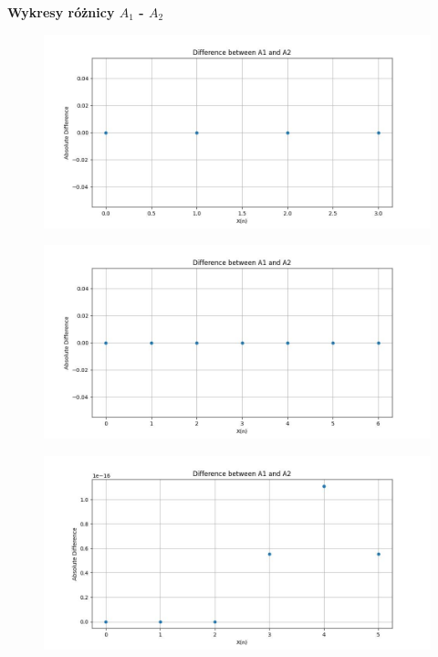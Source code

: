 \documentclass{article}
\begin{document}
\hspace{}

\textbf{Wykresy różnicy $A_1$ - $A_2$}

\begin{figure}[ht!]
    \centering
    \includegraphics[width=1\linewidth]{h1_plot_1.jpg}
    \label{fig:my_label}
\end{figure}


\begin{figure}[ht!]
    \centering
    \includegraphics[width=1\linewidth]{h1_plot_2.jpg}
    \label{fig:enter-label}
\end{figure}

\begin{figure}
    \centering
    \includegraphics[width=1\linewidth]{h1_plot_3.jpg}
    \label{fig:enter-label}
\end{figure}
\end{document}
